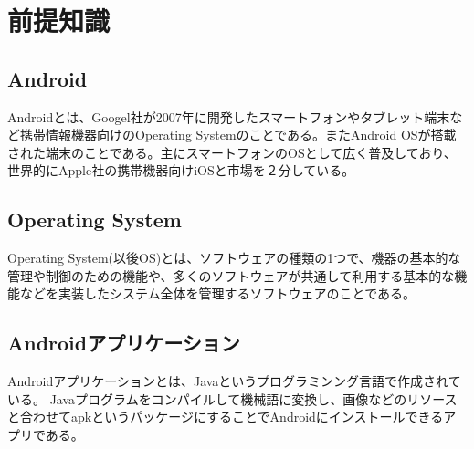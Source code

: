 \newpage
\section{前提知識}


\subsection{Android}
Androidとは、Googel社が2007年に開発したスマートフォンやタブレット端末など携帯情報機器向けのOperating Systemのことである。またAndroid OSが搭載された端末のことである。主にスマートフォンのOSとして広く普及しており、世界的にApple社の携帯機器向けiOSと市場を２分している。


\subsection{Operating System}
Operating System(以後OS)とは、ソフトウェアの種類の1つで、機器の基本的な管理や制御のための機能や、多くのソフトウェアが共通して利用する基本的な機能などを実装したシステム全体を管理するソフトウェアのことである。


\subsection{Androidアプリケーション}
Androidアプリケーションとは、Javaというプログラミンング言語で作成されている。
Javaプログラムをコンパイルして機械語に変換し、画像などのリソースと合わせてapkというパッケージにすることでAndroidにインストールできるアプリである。


